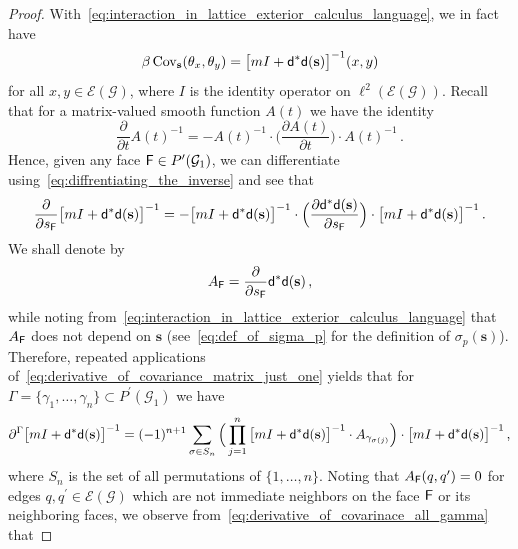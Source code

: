 \documentclass[11pt]{article}
\theoremstyle{definition}
\theoremstyle{remark}
\numberwithin{theorem}{section}
\def\Ga{{\Gamma}}
\newcommand{\cE}{\mathcal{E}}
\newcommand{\cG}{\mathcal G}
\newcommand{\Cov}{\operatorname{Cov}}
\begin{document}
\begin{proof}
        With~\eqref{eq:interaction_in_lattice_exterior_calculus_language}, we in fact have
        \begin{equation} \label{eq:writting_the_covariance_in_matrix_form}
            \beta \Cov_{\mathbf{s}}(\theta_x,\theta_y) = \big[m I + {\sf d}^\ast {\sf d}(\mathbf{s}) \big]^{-1} (x,y)
        \end{equation}
         for all $x,y\in \cE(\mathcal{G})$, where $I$ is the identity operator on $\ell^2(\cE(\mathcal{G}))$. Recall that for a matrix-valued smooth function $A(t)$ we have the identity
         \begin{equation} \label{eq:diffrentiating_the_inverse}
             \frac{\partial }{\partial t}A(t)^{-1} = -A(t)^{-1} \cdot \Big(\frac{\partial A(t)}{\partial t}\Big) \cdot  A(t)^{-1} \, .
         \end{equation}
         Hence, given any face ${\sf F} \in P^\prime(\mathcal{G}_1)$, we can differentiate using~\eqref{eq:diffrentiating_the_inverse} and see that
         \begin{equation} \label{eq:derivative_of_covariance_matrix_just_one}
             \frac{\partial}{ \partial s_{\sf F}} \big[m I + {\sf d}^\ast {\sf d}(\mathbf{s}) \big]^{-1} = -\big[m I + {\sf d}^\ast {\sf d}(\mathbf{s}) \big]^{-1} \cdot \Big(\frac{\partial {\sf d}^\ast {\sf d}(\mathbf{s})}{\partial s_{\sf F}}\Big) \cdot \big[m I + {\sf d}^\ast {\sf d}(\mathbf{s}) \big]^{-1} \, .
         \end{equation} 
         We shall denote by 
         \[
         A_{\sf F} = \frac{\partial}{\partial s_{\sf F}} {\sf d}^\ast {\sf d}(\mathbf{s}) \, ,
         \]
         while noting from~\eqref{eq:interaction_in_lattice_exterior_calculus_language} that $A_{\sf F}$ does not depend on $\mathbf{s}$ (see~\eqref{eq:def_of_sigma_p} for the definition of $\sigma_{p}(\mathbf{s})$). Therefore, repeated applications of~\eqref{eq:derivative_of_covariance_matrix_just_one} yields that for $\Ga = \{\gamma_1,\ldots,\gamma_n\} \subset P^\prime(\mathcal{G}_1)$ we have
         \begin{equation} \label{eq:derivative_of_covarinace_all_gamma}
             \partial^\Ga \big[m I + {\sf d}^\ast {\sf d}(\mathbf{s}) \big]^{-1} = (-1)^{n+1} \sum_{\sigma \in S_n}  \Big(\prod_{j=1}^n \big[m I + {\sf d}^\ast {\sf d}(\mathbf{s}) \big]^{-1} \cdot A_{\gamma_{\sigma(j)}} \Big) \cdot  \big[m I + {\sf d}^\ast {\sf d}(\mathbf{s}) \big]^{-1}  \, ,
         \end{equation}
         where $S_n$ is the set of all permutations of $\{1,\ldots,n\}$. Noting that $A_{\sf F}(q,q^\prime) = 0$ for edges $q,q^\prime \in \cE(\cG)$ which are not immediate neighbors on the face ${\sf F}$ or its neighboring faces, we observe from~\eqref{eq:derivative_of_covarinace_all_gamma} that 

\end{proof}
\end{document}
